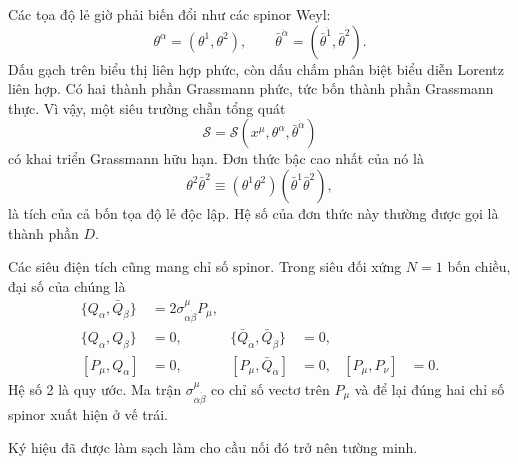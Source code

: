 Các tọa độ lẻ giờ phải biến đổi như các spinor Weyl:
\begin{equation}
\theta^\alpha=(\theta^1,\theta^2),
\qquad
\bar\theta^{\dot\alpha}=(\bar\theta^{\dot1},\bar\theta^{\dot2}).
\end{equation}
Dấu gạch trên biểu thị liên hợp phức, còn dấu chấm phân biệt biểu diễn Lorentz liên hợp. Có hai thành phần Grassmann phức, tức bốn thành phần Grassmann thực. Vì vậy, một siêu trường chẵn tổng quát
\begin{equation}
\mathcal S=\mathcal S(x^\mu,\theta^\alpha,\bar\theta^{\dot\alpha})
\end{equation}
có khai triển Grassmann hữu hạn. Đơn thức bậc cao nhất của nó là
\begin{equation}
\theta^2\bar\theta^2
\equiv
(\theta^1\theta^2)(\bar\theta^{\dot1}\bar\theta^{\dot2}),
\end{equation}
là tích của cả bốn tọa độ lẻ độc lập. Hệ số của đơn thức này thường được gọi là thành phần \(D\).

Các siêu điện tích cũng mang chỉ số spinor. Trong siêu đối xứng \(N=1\) bốn chiều, đại số của chúng là
\begin{align}
\{Q_\alpha,\bar Q_{\dot\beta}\}
&=2\sigma^\mu_{\alpha\dot\beta}P_\mu,
\label{eq:l8-superalgebra-main}\\
\{Q_\alpha,Q_\beta\}&=0,
&
\{\bar Q_{\dot\alpha},\bar Q_{\dot\beta}\}&=0,
\label{eq:l8-superalgebra-nilpotent}\\
[P_\mu,Q_\alpha]&=0,
&
[P_\mu,\bar Q_{\dot\alpha}]&=0,
&
[P_\mu,P_\nu]&=0.
\label{eq:l8-superalgebra-commutators}
\end{align}
Hệ số 2 là quy ước. Ma trận
\(\sigma^\mu_{\alpha\dot\beta}\)
co chỉ số vectơ trên \(P_\mu\) và để lại đúng hai chỉ số spinor xuất hiện ở vế trái.

\begin{classroomqa}
\end{classroomqa}

Ký hiệu đã được làm sạch làm cho cầu nối đó trở nên tường minh.

